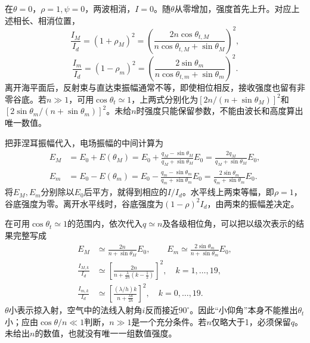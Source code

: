 \documentclass[UTF8,fontset=fandol,a4paper,11pt]{ctexart}
\newcommand{\figcaption}[1]{\par\vspace{2pt}{\small\color{muted}#1}\par}
\begin{document}
\begin{center}\begin{minipage}{.98\linewidth}\centering
{}
\figcaption{解图光2.2C\quad 相长与相消时合振幅的加减}
\end{minipage}\end{center}
在$\theta=0$，$\rho=1,\psi=0$，两波相消，$I=0$。随$\theta$从零增加，强度首先上升。对应上述相长、相消位置，
\[
\frac{I_M}{I_d}=(1+\rho_M)^2
=\left(\frac{2n\cos\theta_{t,M}}{n\cos\theta_{t,M}+\sin\theta_M}\right)^2,
\]
\[
\frac{I_m}{I_d}=(1-\rho_m)^2
=\left(\frac{2\sin\theta_m}{n\cos\theta_{t,m}+\sin\theta_m}\right)^2.
\]
离开海平面后，反射束与直达束振幅通常不等，即使相位相反，接收强度也留有非零谷底。若$n\gg1$，可用$\cos\theta_t\simeq1$，上两式分别化为$[2n/(n+\sin\theta_M)]^2$和$[2\sin\theta_m/(n+\sin\theta_m)]^2$。未给$n$时强度只能保留参数，不能由波长和高度算出唯一数值。


把菲涅耳振幅代入，电场振幅的中间计算为
\[
\begin{aligned}
E_M&=E_0+E(\theta_M)
=E_0+\frac{q_M-\sin\theta_M}{q_M+\sin\theta_M}E_0
=\frac{2q_M}{q_M+\sin\theta_M}E_0,\\
E_m&=E_0-E(\theta_m)
=E_0-\frac{q_m-\sin\theta_m}{q_m+\sin\theta_m}E_0
=\frac{2\sin\theta_m}{q_m+\sin\theta_m}E_0 .
\end{aligned}
\]
将$E_M,E_m$分别除以$E_0$后平方，就得到相应的$I/I_d$。水平线上两束等幅，即$\rho=1$，谷底强度为零。离开水平线时，谷底强度为$(1-\rho)^2 I_d$，由两束的振幅差决定。

在可用$\cos\theta_t\simeq1$的范围内，依次代入$q\simeq n$及各级相位角，可以把以级次表示的结果完整写成
\[
\begin{aligned}
E_M&\simeq\frac{2n}{n+\sin\theta_M}E_0,\qquad
E_m\simeq\frac{2\sin\theta_m}{n+\sin\theta_m}E_0,\\
\frac{I_{M,k}}{I_d}
&\simeq
\left[\frac{2n}{n+\frac{\lambda}{2h}(k-\frac12)}\right]^2,\quad k=1,\ldots,19,\\
\frac{I_{m,k}}{I_d}
&\simeq
\left[\frac{(\lambda/h)k}{n+\frac{\lambda k}{2h}}\right]^2,\quad k=0,\ldots,19 .
\end{aligned}
\]
$\theta$小表示掠入射，空气中的法线入射角$i$反而接近$90^\circ$。因此“小仰角”本身不能推出$\theta_t$小；应由$\cos\theta/n\ll1$判断，$n\gg1$是一个充分条件。若$n$仅略大于1，必须保留$q$。未给出$n$的数值，也就没有唯一一组数值强度。
\end{document}
